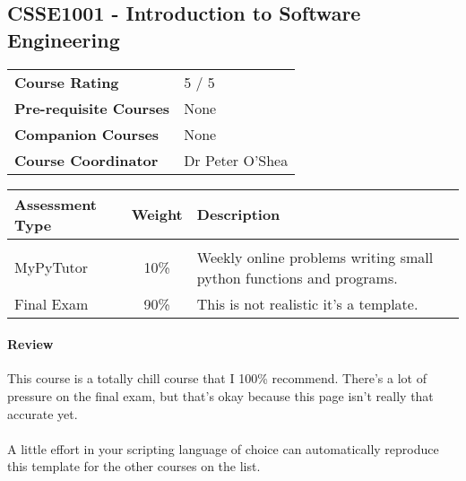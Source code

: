 
\subsection{CSSE1001 - Introduction to Software Engineering}

\begin{table}[H]
\begin{tabular}{ l  l }
\textbf{Course Rating} &

5 / 5

\\
\textbf{Pre-requisite Courses} &

None

\\
\textbf{Companion Courses} &

None

\\
\textbf{Course Coordinator} &

Dr Peter O'Shea

\end{tabular}
\end{table}

\begin{table}[H]
\begin{tabular}{ l c  p{7cm}}
\textbf{Assessment Type} & \textbf{Weight} & \textbf{Description} \\
\hline
\\

MyPyTutor &
10\% &
Weekly online problems writing small python functions and programs. \\

Final Exam &
90\% &
This is not realistic it's a template. \\

\end{tabular}
\end{table}

\paragraph{Review} 
This course is a totally chill course that I 100\% recommend. There's a lot of pressure on the final exam, but that's okay because this page isn't really that accurate yet.

\paragraph{}
A little effort in your scripting language of choice can automatically reproduce this template for the other courses on the list. 
